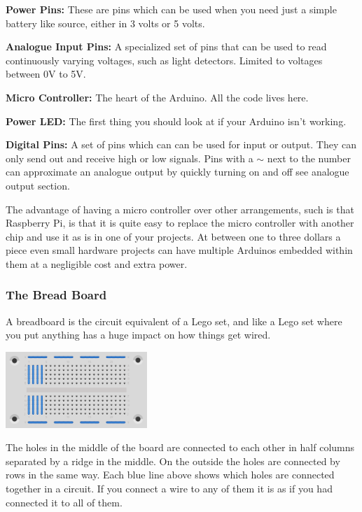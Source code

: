 \textbf{Power Pins:}
These are pins which can be used when you need just a simple battery like source,
either in 3 volts or 5 volts.

\textbf{Analogue Input Pins:}
A specialized set of pins that can be used to read continuously varying voltages,
such as light detectors.
Limited to voltages between 0V to 5V.

\textbf{Micro Controller:}
The heart of the Arduino.
All the code lives here.

\textbf{Power LED:}
The first thing you should look at if your Arduino isn't working.

\textbf{Digital Pins:}
A set of pins which can can be used for input or output.
They can only send out and receive high or low signals. 
Pins with a $\sim$ next to the number can approximate an analogue output
by quickly turning on and off see analogue output section.

The advantage of having a micro controller over other arrangements,
such is that Raspberry Pi,
is that it is quite easy to replace the micro controller with another chip
and use it as is in one of your projects.
At between one to three dollars a piece even small hardware projects can have multiple Arduinos embedded within them at a negligible cost and extra power.

\subsubsection{The Bread Board}
\label{subsub:Breadboard}

A breadboard is the circuit equivalent of a Lego set,
and like a Lego set where you put anything has a huge impact on how things get wired.

\begin{center}
    \includegraphics[width=0.4\textwidth]{./Graphics/breadboard_wiring}
\end{center}

The holes in the middle of the board are connected to each other in half columns separated by a ridge in the middle.
On the outside the holes are connected by rows in the same way.
Each blue line above shows which holes are connected together in a circuit.
If you connect a wire to any of them it is as if you had connected it to all of them.

